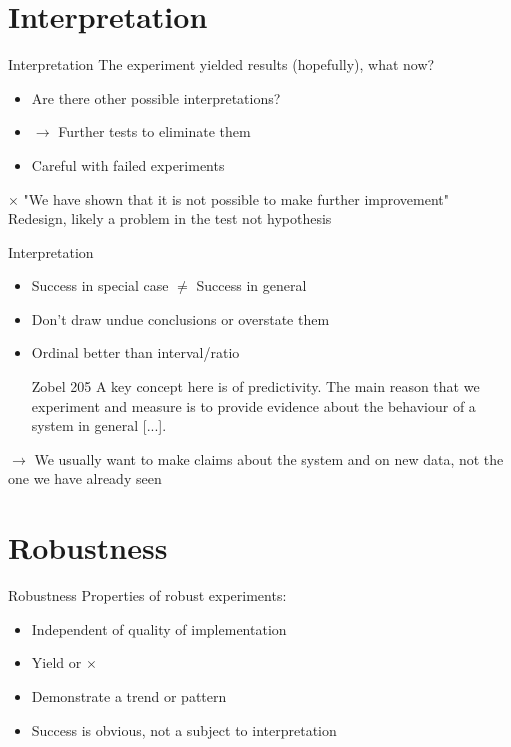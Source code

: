 \documentclass{beamer}
\begin{document}
\section{Interpretation}
\begin{frame}{Interpretation}
The experiment yielded results (hopefully), what now? \\
\begin{itemize}
\item Are there other possible interpretations?
\item[] $\rightarrow$ Further tests to eliminate them
\item Careful with failed experiments

\end{itemize}
\color{red} $\times$ \color{black} "We have shown that it is not possible to
make further improvement" \\
\color{green} \checkmark \color{black} Redesign, likely a problem in the test not hypothesis
\end{frame}

\begin{frame}{Interpretation}
\begin{itemize}
\item  Success in special case $\not =$ Success in general
\item Don't draw undue conclusions or overstate them
\item Ordinal better than interval/ratio
\begin{block}{Zobel 205}
A key concept here is of predictivity. The main reason that we experiment and
measure is to provide evidence about the behaviour of a system in general [...].
\end{block}
\end{itemize}
$\rightarrow$ We usually want to make claims about the system and on new data, not the one we have already seen
\end{frame}


\section{Robustness}
\begin{frame}{Robustness}
Properties of robust experiments:
\begin{itemize}

\item Independent of quality of implementation 
\item Yield \color{green}\checkmark \color{black}  or \color{red} $\times$ \color{black} 
\item Demonstrate a trend or pattern
\item Success is obvious, not a subject to interpretation

\end{itemize}
\end{frame}
\end{document}
